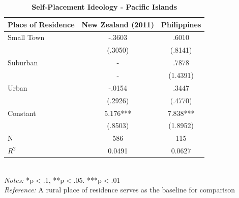 \documentclass[12pt, titlepage]{article}
\newcommand\e{\emph}
\newcommand\tb{\textbf}
\begin{document}
\begin{singlespace}
	\begin{table}[H]
		\centering
		\caption{\tb{Self-Placement Ideology - Pacific Islands}}
		\begin{tabulary}{\linewidth}{l c c }
			\\
			\hline
			\tb{Place of Residence}&\tb{New Zealand (2011)}&\tb{Philippines}\\
			\hline
			Small Town & -.3603  & .6010  \\      
			& (.3050) & (.8141)    \\
			Suburban  & -   & .7878  \\ 
			 & -   & (1.4391)       \\
			Urban  & -.0154   & .3447 \\
			 &(.2926)   & (.4770)      \\
			Constant  & 5.176***  & 7.838***   \\
			&(.8503)&(1.8952) \\
			N  &586 & 115  \\
			$R^2$  &0.0491  &0.0627     \\
			\hline                                       
		\end{tabulary} 
		\\
		\e{Notes:} *p$<$.1, **p$<$.05. ***p$<$.01 \\
		\e{Reference:} A rural place of residence serves as the baseline for comparison
		\label{table13}
	\end{table}
\end{singlespace}
\end{document}
